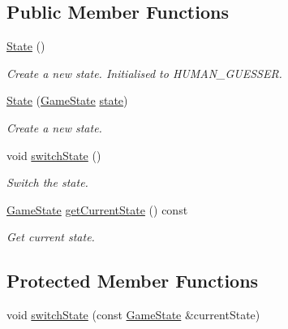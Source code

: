 \subsection*{Public Member Functions}
\begin{DoxyCompactItemize}
\item 
\hyperlink{classmastermind_1_1shell_1_1_state_a78a389eea152b0305d9600a2cd5decc9}{State} ()
\begin{DoxyCompactList}\small\item\em Create a new state. Initialised to H\+U\+M\+A\+N\+\_\+\+G\+U\+E\+S\+S\+ER. \end{DoxyCompactList}\item 
\hyperlink{classmastermind_1_1shell_1_1_state_acb7ba3f392b85eec1ae099d2c2b34a89}{State} (\hyperlink{classmastermind_1_1shell_1_1_state_a7667dd4920335355f616e9ffc2793d0b}{Game\+State} \hyperlink{classmastermind_1_1shell_1_1_state_a499c4fed4175dd2cc71d325882d3049e}{state})
\begin{DoxyCompactList}\small\item\em Create a new state. \end{DoxyCompactList}\item 
void \hyperlink{classmastermind_1_1shell_1_1_state_ad09ab9698069829ead2841338cf86a6b}{switch\+State} ()
\begin{DoxyCompactList}\small\item\em Switch the state. \end{DoxyCompactList}\item 
\hyperlink{classmastermind_1_1shell_1_1_state_a7667dd4920335355f616e9ffc2793d0b}{Game\+State} \hyperlink{classmastermind_1_1shell_1_1_state_a271f58e7d38180a9c52ff42e2c7de961}{get\+Current\+State} () const
\begin{DoxyCompactList}\small\item\em Get current state. \end{DoxyCompactList}\end{DoxyCompactItemize}
\subsection*{Protected Member Functions}
\begin{DoxyCompactItemize}
\item 
void \hyperlink{classmastermind_1_1shell_1_1_state_a9e4c9895ef013d1d16c1db240ee32344}{switch\+State} (const \hyperlink{classmastermind_1_1shell_1_1_state_a7667dd4920335355f616e9ffc2793d0b}{Game\+State} \&current\+State)
\end{DoxyCompactItemize}
